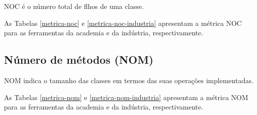 NOC é o número total de flhos de uma classe.

As Tabelas \ref{metrica-noc} e \ref{metrica-noc-industria} apresentam a
métrica NOC para as ferramentas da academia e da indústria, respectivamente.



\subsection{Número de métodos (NOM)}

NOM indica o tamanho das classes em termos das suas operações implementadas.

As Tabelas \ref{metrica-nom} e \ref{metrica-nom-industria} apresentam a
métrica NOM para as ferramentas da academia e da indústria, respectivamente.


